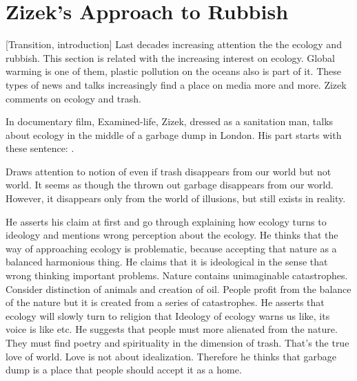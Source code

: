  





%
%
\section{Zizek's Approach to Rubbish}
[Transition, introduction] 
 Last decades increasing attention the the ecology and rubbish. This section is related with the increasing interest on ecology. Global warming is one of them, plastic pollution on the oceans also is part of it. These types of news and talks increasingly find a place on media more and more. Zizek comments on ecology and trash.

In documentary film, Examined-life, Zizek, dressed as a sanitation man, talks about ecology in the middle of a garbage dump in London. His part starts with these sentence: . 

Draws attention to notion of even if trash disappears from our world but not world. It seems as though the thrown out garbage disappears from our world. However, it disappears only from the world of illusions, but still exists in reality. 

He asserts his claim at first and go through explaining how ecology turns to ideology and mentions wrong perception about the ecology. He thinks that the way of approaching ecology is problematic, because accepting that nature as a balanced harmonious thing. He claims that it is ideological in the sense that wrong thinking important problems. Nature contains unimaginable catastrophes. Consider distinction of animals and creation of oil. People profit from the balance of the nature but it is created from a series of catastrophes. He asserts that ecology will slowly turn to religion that  Ideology of ecology warns us like,  its voice is like  etc. He suggests that people must more alienated from the nature. They must find poetry and spirituality in the dimension of trash. That's the true love of world. Love is not about idealization. Therefore he thinks that garbage dump is a place that people should accept it as a home.

